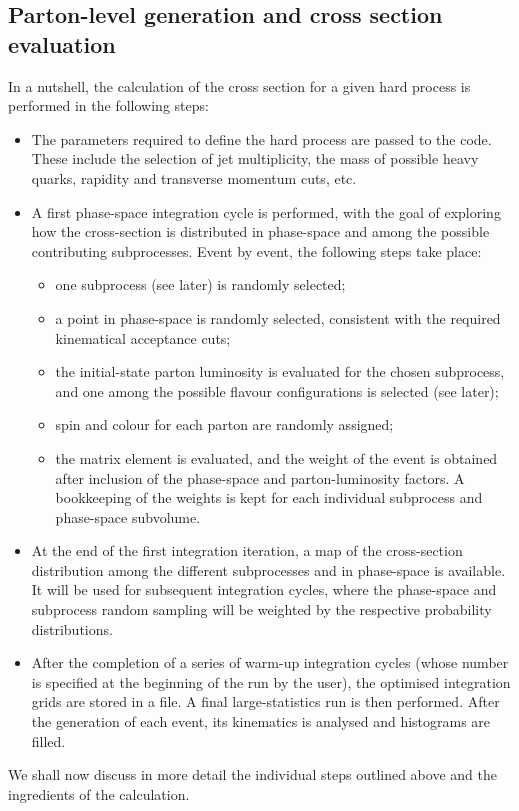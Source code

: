 \documentclass[paper]{JHEP3}
\begin{document}
\subsection{Parton-level generation and cross section evaluation}
\label{sec:xsec}
In a nutshell, the calculation of the cross section for a given hard
process is performed in the following steps:
\begin{itemize}
\item The parameters required to define the hard process are passed to
  the code. These include the selection of jet multiplicity, the
  mass of possible heavy quarks, rapidity and transverse momentum
  cuts, etc.
\item A first phase-space integration cycle is performed, with the goal of
 exploring how the cross-section is distributed in phase-space and
  among the possible contributing  subprocesses. Event by event, the
  following steps take place:
\begin{itemize}
  \item one subprocess (see later) is randomly selected; 
  \item a point in phase-space is randomly selected, consistent with
    the required kinematical acceptance cuts;
  \item the initial-state parton luminosity is evaluated for the
    chosen subprocess, and 
   one among the possible flavour configurations is selected (see later);
  \item
    spin and colour for each parton are randomly assigned;
  \item the matrix element is evaluated, and the weight of the event
    is obtained after inclusion of the phase-space and parton-luminosity
    factors. A bookkeeping of the weights is kept for each individual
   subprocess and phase-space subvolume.
\end{itemize}
\item At the end of the first integration iteration, a map of the
  cross-section distribution among the different subprocesses and in
  phase-space is available. It will be used for subsequent
  integration cycles, where the phase-space and subprocess random sampling
  will be weighted by the respective probability distributions.
\item After the completion of a series of warm-up integration cycles (whose
  number is specified at the beginning of the run by the user), the
  optimised integration grids are stored in a file. A final
  large-statistics run is then performed. After the generation of each
  event, its kinematics is analysed and histograms are filled.
\end{itemize}
We shall now discuss in more detail the individual steps outlined
above and the ingredients of the calculation.
\end{document}
